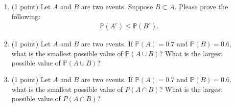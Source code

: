 \documentclass[11pt]{article}
\begin{document}
\begin{enumerate}
\item (1 point) Let $A$ and $B$ are two events. Suppose $B\subset A$. Please prove the following:
\begin{align*}
\mathbb{P}(A^c) \le \mathbb{P}(B^c).
\end{align*}

\item (1 point) Let $A$ and $B$ are two events. If $\mathbb{P}(A) = 0.7$ and $\mathbb{P}(B)=0.6$,  what is the smallest possible value of $\mathbb{P}(A\cup B)$? What is the largest possible value of $\mathbb{P}(A\cup B)$? 

\item (1 point) Let $A$ and $B$ are two events. If $\mathbb{P}(A) = 0.7$ and $\mathbb{P}(B)=0.6$, what is the smallest possible value of $P(A\cap B)$? What is the largest possible value of $P(A\cap B)$? 


\end{enumerate}
\end{document}
